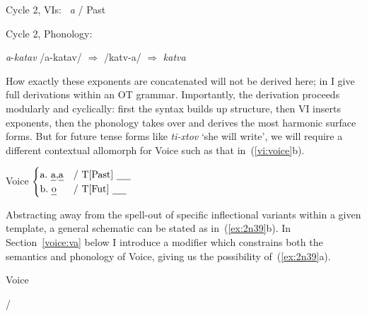 \begin{exe}
\begin{xlist}
\begin{exe}
\begin{xlist}
\begin{exe}
\begin{xlist}
\begin{exe}
\begin{exe}
\begin{xlist}
\begin{exe}
\begin{xlist}
\begin{exe}
\begin{xlist}
\begin{exe}
\begin{xlist}
\begin{exe}
\begin{xlist}
\begin{exe}
\begin{xlist}
\begin{exe}
\begin{xlist}
\begin{exe}
\begin{xlist}
\begin{exe}
\begin{xlist}
\begin{exe}
\begin{xlist}
\begin{exe}
\begin{xlist}
\begin{exe}
\begin{xlist}
\begin{exe}
\begin{xlist}
\begin{exe}
\begin{exe}
\begin{xlist}
\begin{exe}
\begin{xlist}
\begin{exe}
\begin{xlist}
\begin{exe}
\begin{xlist}
{\begin{exe}
\begin{xlist}
\begin{exe}
\begin{xlist}
\begin{exe}
\begin{xlist}
\begin{exe}
\begin{xlist}
\begin{xlist}
\begin{xlist}
\begin{exe}
\begin{xlist}
\begin{xlist}
\ex   Cycle 2, VIs: 
	 \lra~\emph{a} / Past \trace

 \ex  Cycle 2, Phonology: 
 \begin{xlist} 
 	\ex   \emph{a}-\emph{katav} 
 	\ex   /a-katav/ $\Rightarrow$ /katv-a/ $\Rightarrow$ \emph{katva} 
 \z
\z 

How exactly these exponents are concatenated will not be derived here; in \cite{kastner18nllt} I give full derivations within an OT grammar. Importantly, the derivation proceeds modularly and cyclically: first the syntax builds up structure, then VI inserts exponents, then the phonology takes over and derives the most harmonic surface forms. But for future tense forms like \emph{ti-xtov} `she will write', we will require a different contextual allomorph for Voice such as that in~(\ref{vi:voice}b).
 \begin{exe}
\ex  \label{vi:voice} Voice \lra $\begin{cases} 
		\text{a.~\emph{a},\emph{a}} & \text{/ T[Past] \trace}\\
		\text{b.~\emph{o}} & \text{/ T[Fut] \trace}\\
		\end{cases}$
 \z 

Abstracting away from the spell-out of specific inflectional variants within a given template, a general schematic can be stated as in~(\ref{ex:2n39}b). In Section~\ref{voice:va} below I introduce a modifier which constrains both the semantics and phonology of Voice, giving us the possibility of~(\ref{ex:2n39}a).
 \begin{exe}
 \ex  \label{ex:2n39}Voice {\lra} 
 \begin{xlist} 
 	\ex   {\tpie} / {\trace} {\va} 
 	\ex   {\tkal} 
 \z
\z 


\end{xlist}
\end{exe}
\end{exe}
\end{xlist}
\end{xlist}
\end{xlist}
\end{exe}
\end{xlist}
\end{xlist}
\end{xlist}
\end{exe}
\end{xlist}
\end{exe}
\end{xlist}
\end{exe}
\end{xlist}
\end{exe}}
\end{xlist}
\end{exe}
\end{xlist}
\end{exe}
\end{xlist}
\end{exe}
\end{xlist}
\end{exe}
\end{exe}
\end{xlist}
\end{exe}
\end{xlist}
\end{exe}
\end{xlist}
\end{exe}
\end{xlist}
\end{exe}
\end{xlist}
\end{exe}
\end{xlist}
\end{exe}
\end{xlist}
\end{exe}
\end{xlist}
\end{exe}
\end{xlist}
\end{exe}
\end{xlist}
\end{exe}
\end{xlist}
\end{exe}
\end{xlist}
\end{exe}
\end{xlist}
\end{exe}
\end{exe}
\end{xlist}
\end{exe}
\end{xlist}
\end{exe}
\end{xlist}
\end{exe}
